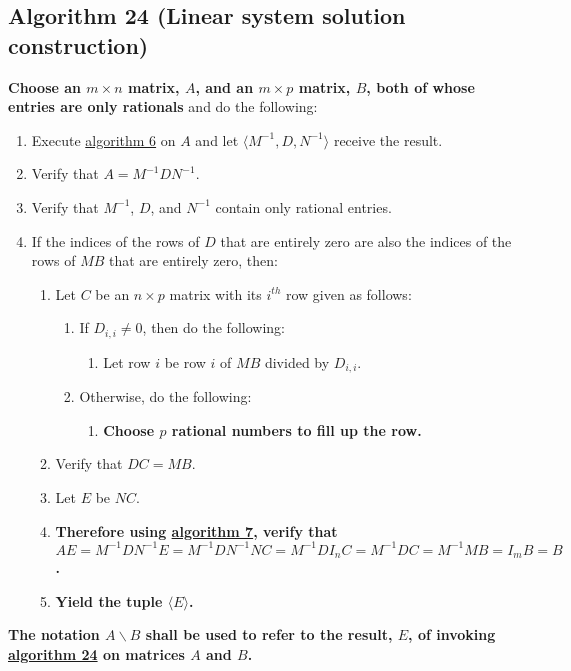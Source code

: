 \documentclass[twocolumn]{article}
\begin{document}
		\subsection{Algorithm 24 (Linear system solution construction)}\label{sec:algorithm 24}
			\textbf{Choose an $m\times n$ matrix, $A$, and an $m\times p$ matrix, $B$, both of whose entries are only rationals} and do the following:
			\begin{enumerate}
				\item Execute \hyperref[sec:algorithm 6]{algorithm 6} on $A$ and let $\langle M^{-1},D,N^{-1}\rangle$ receive the result.
				\item Verify that $A=M^{-1}DN^{-1}$.
				\item Verify that $M^{-1}$, $D$, and $N^{-1}$ contain only rational entries.
				\item If the indices of the rows of $D$ that are entirely zero are also the indices of the rows of $MB$ that are entirely zero, then:
				\begin{enumerate}
					\item Let $C$ be an $n\times p$ matrix with its $i^{th}$ row given as follows:
					\begin{enumerate}
						\item If $D_{i,i}\ne 0$, then do the following:
						\begin{enumerate}
							\item Let row $i$ be row $i$ of $MB$ divided by $D_{i,i}$.
						\end{enumerate}
						\item Otherwise, do the following:
						\begin{enumerate}
							\item \textbf{Choose $p$ rational numbers to fill up the row.}
						\end{enumerate}
					\end{enumerate}
					\item Verify that $DC=MB$.
					\item Let $E$ be $NC$.
					\item \textbf{Therefore using \hyperref[sec:algorithm 7]{algorithm 7}, verify that $AE=M^{-1}DN^{-1}E=M^{-1}DN^{-1}NC=M^{-1}DI_nC=M^{-1}DC=M^{-1}MB=I_mB=B$.}
					\item \textbf{Yield the tuple $\langle E\rangle$.}
				\end{enumerate} 
			\end{enumerate}
			\textbf{The notation $A\backslash B$ shall be used to refer to the result, $E$, of invoking \hyperref[sec:algorithm 24]{algorithm 24} on matrices $A$ and $B$.}
			
\end{document}
